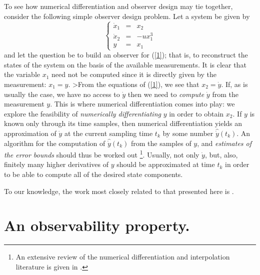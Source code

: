 To see how numerical differentiation and observer design may tie together, 
consider the 
following simple observer design problem.
Let a system be given by
\begin{equation}
\left\{
\begin{array}{rcl}
\dot x_1 & = & x_2\\
\dot x_2 & = & -ux_1^3\\
y & = & x_1\end{array}
\right. \label{1}
\end{equation}
and let the question be to build an observer for (\ref{1}); that is,
to reconstruct the states of the system on the basis of the available
measurements.
It is clear that the variable $x_1$ need not be computed since it 
is directly given by the measurement: $ x_1 = y$.
>From the equations of (\ref{1}), we see that $x_2 = \dot y$.
If, as is usually the case, we have no access to 
$\dot y$ then we need to {\it compute} $\dot y$ from the measurement $y$.
This is where numerical differentiation comes into play:
we explore the feasibility of {\it numerically
differentiating} $y$ in order to obtain $x_2$.
If $y$ is known only through its time samples, then numerical 
differentiation yields an approximation of
$\dot y$ at the current sampling time $t_k$ by some number
$\hat {\dot y}(t_k)$.
An algorithm for the computation of $\hat {\dot y}(t_k)$ from the
samples of $y$, and {\it estimates of the error bounds} should thus be worked
out \footnote{An extensive review of the numerical differentiation and
interpolation
literature is given in \cite{UMTechReport93}.}.
Usually, not only $\dot y$, but, also, finitely many higher
derivatives of $y$ should be approximated at time $t_k$ in order to be
able to compute all of the desired state components.

To our knowledge, the work most closely related to that presented here
is \cite{Sch73}.

\section{An observability property.}\setcounter{equation}{0}
\label{observability}

